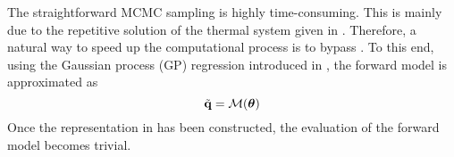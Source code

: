 The straightforward MCMC sampling is highly time-consuming. This is mainly due to the repetitive solution of the thermal system given in . Therefore, a natural way to speed up the computational process is to bypass . To this end, using the Gaussian process (GP) regression introduced in , the forward model is approximated as
\begin{equation} \elabel{gp-approximation}
  \mvT = \model{\vparam}
\end{equation}
Once the representation in  has been constructed, the evaluation of the forward model becomes trivial.

